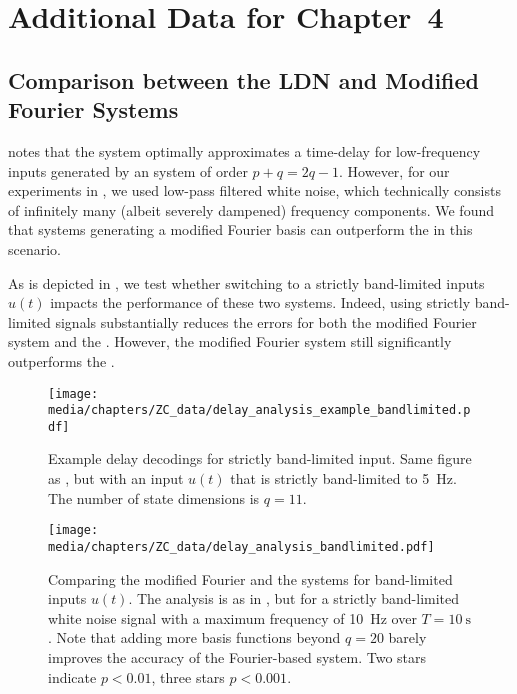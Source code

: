 
\section{Additional Data for Chapter~4}
\label{app:data_chp4}

\subsection{Comparison between the LDN and Modified Fourier Systems}
\label{sec:ldn_mfn_basis_bandlimit}

 notes that the \LDN system optimally approximates a time-delay for low-frequency inputs generated by an \LTI system of order $p + q = 2q - 1$.
However, for our experiments in , we used low-pass filtered white noise, which technically consists of infinitely many (albeit severely dampened) frequency components.
We found that \LTI systems generating a modified Fourier basis can outperform the \LDN in this scenario.

As is depicted in , we test whether switching to a strictly band-limited inputs $u(t)$ impacts the performance of these two systems.
Indeed, using strictly band-limited signals substantially reduces the errors for both the modified Fourier system and the \LDN.
However, the modified Fourier system still significantly outperforms the \LDN.

\vspace{0.125cm}

\begin{figure}[h]
	\centering
	\texttt{[image: media/chapters/ZC\_data/delay\_analysis\_example\_bandlimited.pdf]}
	\caption[Example delay decodings for strictly bandlimited input]{Example delay decodings for strictly band-limited input.
	Same figure as , but with an input $u(t)$ that is strictly band-limited to \SI{5}{\hertz}.
	The number of state dimensions is $q = 11$.
	}
	\label{fig:delay_analysis_example_bandlimited}
\end{figure}

\begin{figure}[h]
	\centering
	\texttt{[image: media/chapters/ZC\_data/delay\_analysis\_bandlimited.pdf]}
	\caption[Comparing the modified Fourier and the LDN systems for band-limited inputs]{Comparing the modified Fourier and the \LDN systems for band-limited inputs $u(t)$. The analysis is as in , but for a strictly band-limited white noise signal with a maximum frequency of \SI{10}{\hertz} over $T = \SI{10}{\second}$.
	Note that adding more basis functions beyond $q = 20$ barely improves the accuracy of the Fourier-based system.
	Two stars indicate $p < 0.01$, three stars $p < 0.001$.}
	\label{fig:delay_analysis_bandlimited}
\end{figure}


